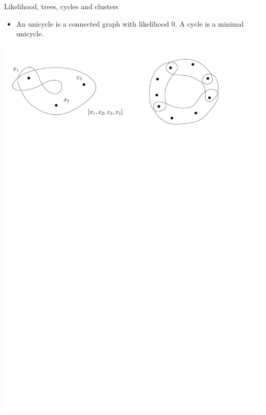 \documentclass[handout, 11pt]{beamer}
\begin{document}
	\begin{frame}{Likelihood, trees, cycles and clusters} 
		\begin{itemize}
			\item An unicycle is a connected graph with likelihood $0$.
			A cycle is a minimal unicycle.
		\end{itemize}
		\begin{center}
			\includegraphics[width=0.9\linewidth]{Cycles.pdf}
		\end{center}
	\end{frame}
\end{document}
